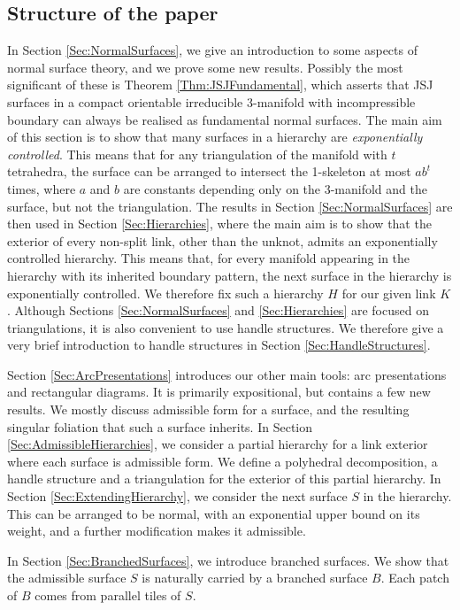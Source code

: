 \documentclass[oneside]{amsart}
\numberwithin{equation}{section}
\theoremstyle{plain}
\theoremstyle{definition}
\begin{document}
\subsection{Structure of the paper} 
In Section \ref{Sec:NormalSurfaces}, we give an introduction to some aspects of normal surface theory,
and we prove some new results. Possibly the most significant of these is Theorem \ref{Thm:JSJFundamental}, which asserts
that JSJ surfaces in a compact orientable irreducible 3-manifold with incompressible boundary can always be realised as fundamental normal surfaces.
The main aim of this section is to show that many surfaces in a hierarchy are \emph{exponentially controlled}.
This means that for any triangulation of the manifold with $t$ tetrahedra, the surface can be arranged
to intersect the 1-skeleton at most $ab^t$ times, where $a$ and $b$ are constants depending only
on the 3-manifold and the surface, but not the triangulation. 
The results in Section \ref{Sec:NormalSurfaces} are then used in Section \ref{Sec:Hierarchies}, where the main 
aim is to show that the exterior of every non-split link, other than the unknot, admits an exponentially controlled hierarchy.
This means that, for every manifold appearing in the hierarchy with its inherited boundary pattern, the next surface 
in the hierarchy is exponentially controlled. We therefore fix such a hierarchy $H$ for our given link $K$.
Although Sections \ref{Sec:NormalSurfaces} and \ref{Sec:Hierarchies} are focused on triangulations,
it is also convenient to use handle structures. We therefore give a very brief introduction to handle structures
in Section \ref{Sec:HandleStructures}.

Section \ref{Sec:ArcPresentations} introduces our other main tools: arc presentations and rectangular diagrams.
It is primarily expositional, but contains a few new results. We mostly discuss admissible form for a surface,
and the resulting singular foliation that such a surface inherits. In Section \ref{Sec:AdmissibleHierarchies}, we 
consider a partial hierarchy for a link exterior where each surface is admissible form. We define a polyhedral
decomposition, a handle structure and a triangulation for the exterior of this partial hierarchy. In Section 
\ref{Sec:ExtendingHierarchy}, we consider the next surface $S$ in the hierarchy. This can be arranged to be normal, 
with an exponential upper bound on its weight, and a further modification makes it admissible.

In Section \ref{Sec:BranchedSurfaces}, we introduce branched surfaces. We show that the admissible
surface $S$ is naturally carried by a branched surface $B$. Each patch of $B$ comes from parallel tiles 
of $S$.
\end{document}
